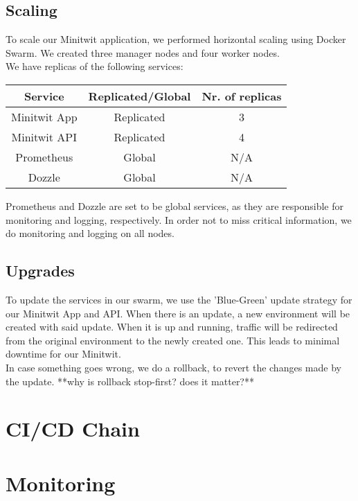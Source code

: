 \subsection{Scaling}
To scale our Minitwit application, we performed horizontal scaling using Docker Swarm. We created three manager nodes and four worker nodes. \\
We have replicas of the following services:\\
\begin{center}
\begin{tabular}{ |c|c|c| } 
 \hline
 Service & Replicated/Global & Nr. of replicas \\ 
 \hline
 Minitwit App & Replicated & 3 \\ 
 \hline
 Minitwit API & Replicated & 4 \\
 \hline
 Prometheus & Global & N/A \\ 
 \hline
 Dozzle & Global & N/A \\ 
 \hline
\end{tabular}
\end{center}

Prometheus and Dozzle are set to be global services, as they are responsible for monitoring and logging, respectively. In order not to miss critical information, we do monitoring and logging on all nodes.

\subsection{Upgrades}
To update the services in our swarm, we use the 'Blue-Green' update strategy for our Minitwit App and API. When there is an update, a new environment will be created with said update. When it is up and running, traffic will be redirected from the original environment to the newly created one. This leads to minimal downtime for our Minitwit.\\
In case something goes wrong, we do a rollback, to revert the changes made by the update. **why is rollback stop-first? does it matter?**

\section{CI/CD Chain}


\section{Monitoring}
